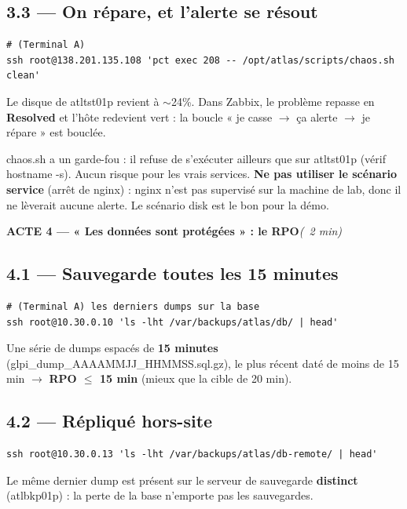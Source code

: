 \documentclass[11pt,a4paper]{article}
\newcommand{\acte}[2]{%
  \begin{tcolorbox}[enhanced,colback=atlasdark,colframe=atlasdark,coltext=white,
    sharp corners,boxrule=0pt,left=3mm,right=3mm,top=2mm,bottom=2mm,
    before skip=10pt,after skip=6pt]%
    {\bfseries\large #1}\dur{#2}%
  \end{tcolorbox}}
\newcommand{\cmd}[1]{{\ttfamily #1}}
\newcommand{\dur}[1]{\hfill{\small\color{codecom}\itshape (#1)}}
\begin{document}
\subsection*{3.3 — On répare, et l'alerte se résout}
\begin{lstlisting}[style=bash]
# (Terminal A)
ssh root@138.201.135.108 'pct exec 208 -- /opt/atlas/scripts/chaos.sh clean'
\end{lstlisting}
\begin{montrer}
Le disque de \cmd{atltst01p} revient à $\sim$24\%. Dans Zabbix, le problème repasse en
\textbf{Resolved} et l'hôte redevient vert : la boucle « je casse $\rightarrow$ ça alerte
$\rightarrow$ je répare » est bouclée.
\end{montrer}
\begin{attention}
\cmd{chaos.sh} a un garde-fou : il refuse de s'exécuter ailleurs que sur \cmd{atltst01p}
(vérif \cmd{hostname -s}). Aucun risque pour les vrais services. \textbf{Ne pas utiliser le
scénario \cmd{service}} (arrêt de nginx) : nginx n'est pas supervisé sur la machine de lab,
donc il ne lèverait aucune alerte. Le scénario \cmd{disk} est le bon pour la démo.
\end{attention}

\acte{ACTE 4 — « Les données sont protégées » : le RPO}{~2 min}

\subsection*{4.1 — Sauvegarde toutes les 15 minutes}
\begin{lstlisting}[style=bash]
# (Terminal A) les derniers dumps sur la base
ssh root@10.30.0.10 'ls -lht /var/backups/atlas/db/ | head'
\end{lstlisting}
\begin{montrer}
Une série de dumps espacés de \textbf{15 minutes} (\cmd{glpi_dump_AAAAMMJJ_HHMMSS.sql.gz}),
le plus récent daté de moins de 15 min $\rightarrow$ \textbf{RPO $\leq$ 15 min}
(mieux que la cible de 20 min).
\end{montrer}

\subsection*{4.2 — Répliqué hors-site}
\begin{lstlisting}[style=bash]
ssh root@10.30.0.13 'ls -lht /var/backups/atlas/db-remote/ | head'
\end{lstlisting}
\begin{montrer}
Le même dernier dump est présent sur le serveur de sauvegarde \textbf{distinct}
(\cmd{atlbkp01p}) : la perte de la base n'emporte pas les sauvegardes.
\end{montrer}
\end{document}
